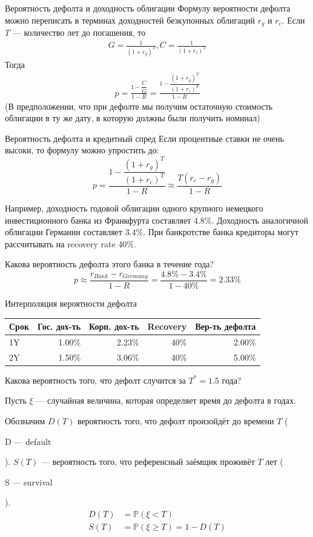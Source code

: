 \documentclass{beamer}
\newcommand{\en}[1]{\begin{otherlanguage}{english}#1\end{otherlanguage}}
\begin{document}
\begin{frame}{Вероятность дефолта и доходность облигации}
\justify
Формулу вероятности дефолта можно переписать в терминах доходностей безкупонных облигаций $r_g$ и $r_c$. Если $T$ --- количество лет до погашения, то
\begin{align*}
G = \frac{1}{(1 + r_g)^T}, C = \frac{1}{(1 + r_c)^T}
\end{align*}
Тогда
\begin{align*}
p = \frac{1 - \dfrac{C}{G}}{1-R} = \frac{1 - \dfrac{(1 + r_g)^T}{(1 + r_c)^T}}{1 - R}
\end{align*}
(В предположении, что при дефолте мы получим остаточную стоимость облигации в ту же дату, в которую должны были получить номинал)
\end{frame}



\begin{frame}{Вероятность дефолта и кредитный спред}
\justify
Если процентные ставки не очень высоки, то формулу можно упростить до:
\begin{equation*}
p = \frac{1 - \dfrac{(1 + r_g)^T}{(1 + r_c)^T}}{1 - R} \approx \frac{T(r_c - r_g)}{1 - R}
\end{equation*}

\justify
Например, доходность годовой облигации одного крупного немецкого инвестиционного банка из Франкфурта составляет 4.8\%. Доходность аналогичной облигации Германии составляет $3.4\%$. При банкротстве банка кредиторы могут рассчитывать на recovery rate 40\%.

\justify
Какова вероятность дефолта этого банка в течение года?
\begin{equation*}
p \approx \frac{r_{Bank} - r_{Germany}}{1-R} = \frac{4.8\% - 3.4\%}{1-40\%} = 2.33\%
\end{equation*}
\end{frame}



\begin{frame}{Интерполяция вероятности дефолта}
\centering
\begin{tabular}{l|r|r|r|r}
Срок & Гос. дох-ть & Корп. дох-ть & Recovery & Вер-ть дефолта \\ \hline
1Y & 1.00\% & 2.23\% & 40\% & 2.00\% \\
2Y & 1.50\% & 3.06\% & 40\% & 5.00\%
\end{tabular}

\justify
Какова вероятность того, что дефолт случится за $T^*=1.5$ года?

\justify
Пусть $\xi$ --- случайная величина, которая определяет время до дефолта в годах.

\justify
Обозначим $D(T)$ вероятность того, что дефолт произойдёт до времени $T$ (\en{D --- default}). $S(T)$ --- вероятность того, что референсный заёмщик проживёт $T$ лет (\en{S --- survival}).
\begin{align*}
D(T) &= \mathbb{P}(\xi < T) \\
S(T) &= \mathbb{P}(\xi \ge T) = 1 - D(T)
\end{align*}
\end{frame}
 
\end{document}
